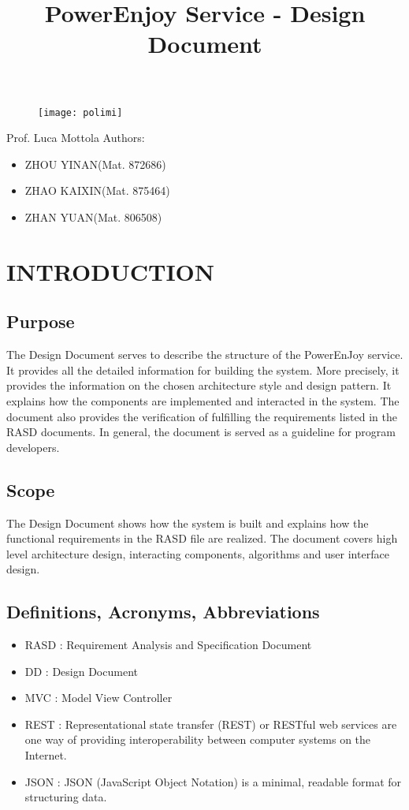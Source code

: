 \documentclass{article}
\title{PowerEnjoy Service - Design Document}
\begin{document}
\begin{titlepage}
\begin{figure}
	\centering
	\texttt{[image: polimi]}
\end{figure}
\maketitle
\centering
Prof. Luca Mottola
\newline
\raggedleft
Authors:
\begin{itemize}
	\raggedleft
	\item ZHOU YINAN(Mat. 872686)
	\item ZHAO KAIXIN(Mat. 875464)
	\item ZHAN YUAN(Mat. 806508)	
\end{itemize}
\end{titlepage}

\tableofcontents
\newpage

	
	\section{INTRODUCTION}
	\subsection{Purpose}
	The Design Document serves to describe the structure of the PowerEnJoy service. It provides all the detailed information for building the system. More precisely, it provides the information on the chosen architecture style and design pattern. It explains how the components are implemented and interacted in the system. The document also provides the verification of fulfilling the requirements listed in the RASD documents. In general, the document is served as a guideline for program developers.
	\subsection{Scope}
	The Design Document shows how the system is built and explains how the functional requirements in the RASD file are realized. The document covers high level architecture design, interacting components,  algorithms and user interface design. 
	\subsection{Definitions, Acronyms, Abbreviations}
	\begin{itemize}
		\item RASD : Requirement Analysis and Specification Document
		\item DD : Design Document
		\item MVC : Model View Controller
		\item REST : Representational state transfer (REST) or RESTful web services are one way of providing interoperability between computer systems on the Internet.
		\item JSON : JSON (JavaScript Object Notation) is a minimal, readable format for structuring data. 
	\end{itemize}
\end{document}
